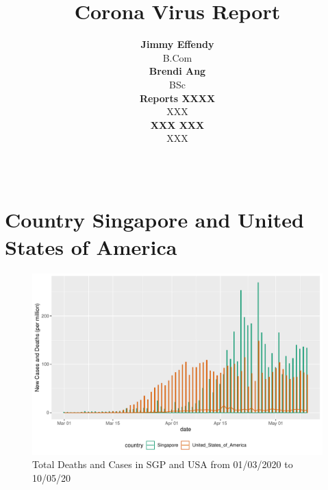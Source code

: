 \documentclass[11pt,a4paper,]{article}
\title{Corona Virus Report}
\author{\sf\Large\textbf{ Jimmy Effendy}\\ {\sf\large B.Com\\[0.5cm]} \sf\Large\textbf{ Brendi Ang}\\ {\sf\large BSc\\[0.5cm]} \sf\Large\textbf{ Reports XXXX}\\ {\sf\large XXX\\[0.5cm]} \sf\Large\textbf{ XXX XXX}\\ {\sf\large XXX\\[0.5cm]}}
\date{\sf\Date~\Month~\Year}
\makeatletter
\def\titlepage{\front{\expandafter{\@title}}{\@author}{\@organization}}
\makeatother
\begin{document}
\titlepage

\section*{Country Singapore and United States of America}

\begin{figure}
\centering
\includegraphics{report_files/figure-latex/sgp-usa-barchart-1.pdf}
\caption{\label{fig:sgp-usa-barchart}Total Deaths and Cases in SGP and USA from 01/03/2020 to 10/05/20}
\end{figure}
\end{document}
